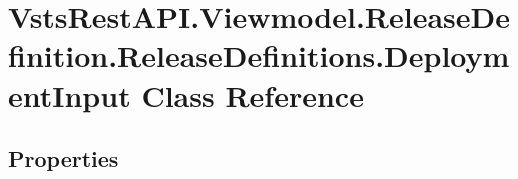 \hypertarget{class_vsts_rest_a_p_i_1_1_viewmodel_1_1_release_definition_1_1_release_definitions_1_1_deployment_input}{}\section{Vsts\+Rest\+A\+P\+I.\+Viewmodel.\+Release\+Definition.\+Release\+Definitions.\+Deployment\+Input Class Reference}
\label{class_vsts_rest_a_p_i_1_1_viewmodel_1_1_release_definition_1_1_release_definitions_1_1_deployment_input}
\subsection*{Properties}
